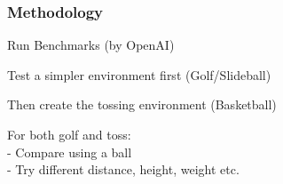 




\begin{frame}
	\frametitle{Methodology}	
	\vspace{1cm}
	
	\begin{PraesentationAufzaehlung}
		\item Run Benchmarks (by OpenAI)
		\item Test a simpler environment first (Golf/Slideball)
		\item Then create the tossing environment (Basketball)
		\item For both golf and toss: \\
		 - Compare using a ball \\
		 - Try different distance, height, weight etc.\\
	\end{PraesentationAufzaehlung}
	
\end{frame}
\clearpage






